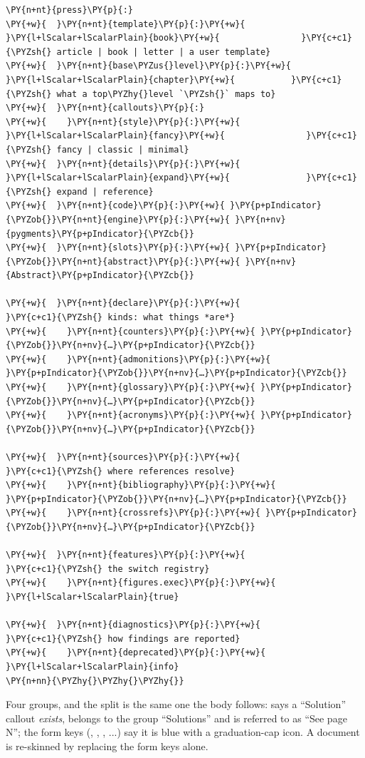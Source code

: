 \documentclass[a4paper,twoside]{article}
\begin{document}
\begin{tscode}[lang=yaml, engine=pygments]
\begin{Verbatim}[commandchars=\\\{\},breaklines, breakanywhere, commandchars=\\\{\}]
\PY{n+nt}{press}\PY{p}{:}
\PY{+w}{  }\PY{n+nt}{template}\PY{p}{:}\PY{+w}{ }\PY{l+lScalar+lScalarPlain}{book}\PY{+w}{                }\PY{c+c1}{\PYZsh{} article | book | letter | a user template}
\PY{+w}{  }\PY{n+nt}{base\PYZus{}level}\PY{p}{:}\PY{+w}{ }\PY{l+lScalar+lScalarPlain}{chapter}\PY{+w}{           }\PY{c+c1}{\PYZsh{} what a top\PYZhy{}level `\PYZsh{}` maps to}
\PY{+w}{  }\PY{n+nt}{callouts}\PY{p}{:}
\PY{+w}{    }\PY{n+nt}{style}\PY{p}{:}\PY{+w}{ }\PY{l+lScalar+lScalarPlain}{fancy}\PY{+w}{                }\PY{c+c1}{\PYZsh{} fancy | classic | minimal}
\PY{+w}{  }\PY{n+nt}{details}\PY{p}{:}\PY{+w}{ }\PY{l+lScalar+lScalarPlain}{expand}\PY{+w}{               }\PY{c+c1}{\PYZsh{} expand | reference}
\PY{+w}{  }\PY{n+nt}{code}\PY{p}{:}\PY{+w}{ }\PY{p+pIndicator}{\PYZob{}}\PY{n+nt}{engine}\PY{p}{:}\PY{+w}{ }\PY{n+nv}{pygments}\PY{p+pIndicator}{\PYZcb{}}
\PY{+w}{  }\PY{n+nt}{slots}\PY{p}{:}\PY{+w}{ }\PY{p+pIndicator}{\PYZob{}}\PY{n+nt}{abstract}\PY{p}{:}\PY{+w}{ }\PY{n+nv}{Abstract}\PY{p+pIndicator}{\PYZcb{}}

\PY{+w}{  }\PY{n+nt}{declare}\PY{p}{:}\PY{+w}{                      }\PY{c+c1}{\PYZsh{} kinds: what things *are*}
\PY{+w}{    }\PY{n+nt}{counters}\PY{p}{:}\PY{+w}{ }\PY{p+pIndicator}{\PYZob{}}\PY{n+nv}{…}\PY{p+pIndicator}{\PYZcb{}}
\PY{+w}{    }\PY{n+nt}{admonitions}\PY{p}{:}\PY{+w}{ }\PY{p+pIndicator}{\PYZob{}}\PY{n+nv}{…}\PY{p+pIndicator}{\PYZcb{}}
\PY{+w}{    }\PY{n+nt}{glossary}\PY{p}{:}\PY{+w}{ }\PY{p+pIndicator}{\PYZob{}}\PY{n+nv}{…}\PY{p+pIndicator}{\PYZcb{}}
\PY{+w}{    }\PY{n+nt}{acronyms}\PY{p}{:}\PY{+w}{ }\PY{p+pIndicator}{\PYZob{}}\PY{n+nv}{…}\PY{p+pIndicator}{\PYZcb{}}

\PY{+w}{  }\PY{n+nt}{sources}\PY{p}{:}\PY{+w}{                      }\PY{c+c1}{\PYZsh{} where references resolve}
\PY{+w}{    }\PY{n+nt}{bibliography}\PY{p}{:}\PY{+w}{ }\PY{p+pIndicator}{\PYZob{}}\PY{n+nv}{…}\PY{p+pIndicator}{\PYZcb{}}
\PY{+w}{    }\PY{n+nt}{crossrefs}\PY{p}{:}\PY{+w}{ }\PY{p+pIndicator}{\PYZob{}}\PY{n+nv}{…}\PY{p+pIndicator}{\PYZcb{}}

\PY{+w}{  }\PY{n+nt}{features}\PY{p}{:}\PY{+w}{                     }\PY{c+c1}{\PYZsh{} the switch registry}
\PY{+w}{    }\PY{n+nt}{figures.exec}\PY{p}{:}\PY{+w}{ }\PY{l+lScalar+lScalarPlain}{true}

\PY{+w}{  }\PY{n+nt}{diagnostics}\PY{p}{:}\PY{+w}{                  }\PY{c+c1}{\PYZsh{} how findings are reported}
\PY{+w}{    }\PY{n+nt}{deprecated}\PY{p}{:}\PY{+w}{ }\PY{l+lScalar+lScalarPlain}{info}
\PY{n+nn}{\PYZhy{}\PYZhy{}\PYZhy{}}
\end{Verbatim}
\end{tscode}
Four groups, and the split is the same one the body follows:  says a
\enquote{Solution} callout \emph{exists}, belongs to the group \enquote{Solutions} and is referred to
as \enquote{See page N}; the form keys (, , , ...) say it is
blue with a graduation-cap icon. A document is re-skinned by replacing the form
keys alone.
\end{document}
